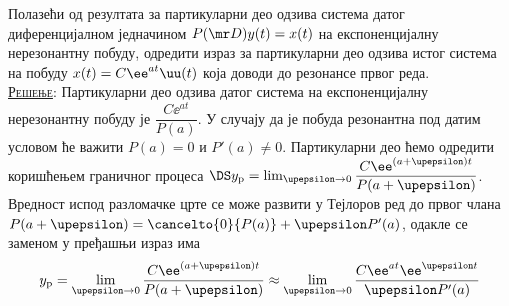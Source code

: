 \PID Полазећи од резултата за партикуларни део одзива система датог диференцијалном једначином
$P(\mr D) y(t) = x(t)$ на експоненцијалну нерезонантну побуду, одредити израз за партикуларни део 
одзива истог система на побуду $x(t) = C\ee^{at}\uu(t)$ која доводи до резонансе првог реда. \\

\textsc{\underline{Решење}}: Партикуларни део одзива датог система на експоненцијалну нерезонантну побуду
је $\dfrac{C\ee^{at}}{P(a)}$. У случају да је побуда резонантна под датим условом ће важити
$P(a) = 0$ и $P'(a) \neq 0$. Партикуларни део ћемо одредити коришћењем граничног процеса 
$\DS y_{\rm p} = \lim_{\upepsilon\to 0}\dfrac{C\ee^{(a+\upepsilon)t}}{P(a + \upepsilon)}$. 
Вредност испод разломачке црте се може развити у Тејлоров ред до првог члана 
$P(a+\upepsilon) = \cancelto{0}{P(a)} + \upepsilon P'(a)$, одакле се заменом у пређашњи 
израз има
\begin{equation}
    y_{\rm p} = \lim_{\upepsilon\to 0}\dfrac{C\ee^{(a+\upepsilon)t}}{P(a + \upepsilon)} \approx 
    \lim_{\upepsilon\to 0}\dfrac{C\ee^{a t} \ee^{\upepsilon t}}{\upepsilon P'(a) }
\end{equation}